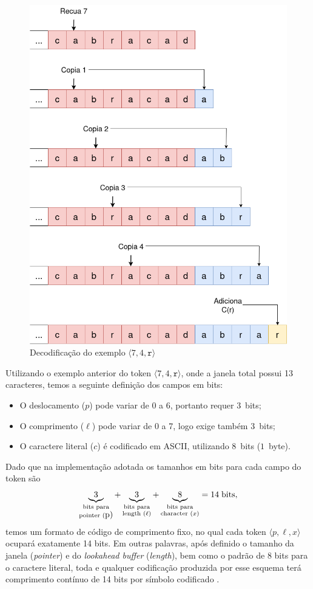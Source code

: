 \begin{figure}[htp]
  \centering
  \caption{Decodificação do exemplo $\langle 7, 4, \texttt{r} \rangle$ }
  \label{fig:Estado_deconding}
  \includegraphics[width=12cm]{figuras/DiagramasTCC-LZ77-Decoding}
\end{figure}

Utilizando o exemplo anterior do token $\langle 7, 4, \texttt{r} \rangle$, onde
a janela total possui 13 caracteres, temos a seguinte definição dos campos em
bits:
\begin{itemize}
  \item O deslocamento ($p$) pode variar de 0 a 6, portanto requer $3$~bits;
  \item  O comprimento ($\ell$) pode variar de 0 a 7, logo exige também $3$~bits;
  \item O caractere literal ($c$) é codificado em ASCII, utilizando $8$~bits
        ($1$~byte).
\end{itemize}
Dado que na implementação adotada os tamanhos em bits para cada campo do token são
\[
  \underbrace{3}_{\substack{\text{bits para}\\\text{pointer }($p$)}} +
  \underbrace{3}_{\substack{\text{bits para}\\\text{length }(\ell)}} +
  \underbrace{8}_{\substack{\text{bits para}\\\text{character }(x)}}
  = 14\;\text{bits},
\]
temos um formato de código de comprimento fixo, no qual cada token $\langle p,
  \ell, x\rangle$ ocupará exatamente 14 bits. Em outras palavras, após definido o
tamanho da janela (\textit{pointer}) e do \textit{lookahead buffer}
(\textit{length}), bem como o padrão de 8 bits para o caractere literal, toda e
qualquer codificação produzida por esse esquema terá comprimento contínuo de 14
bits por símbolo codificado \cite{nelson2008data}.

